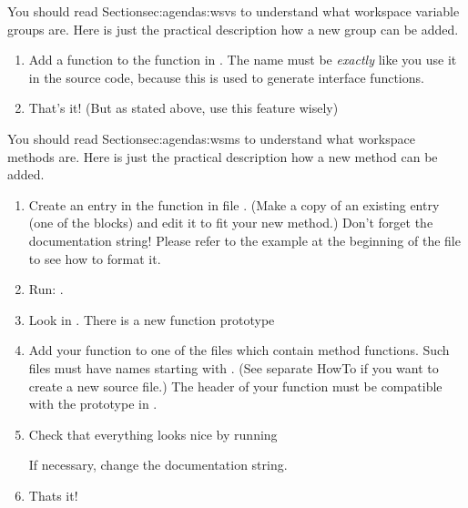 
You should read Section{sec:agendas:wsvs} to understand what workspace
variable groups are. Here is just the practical description how a new
group can be added.

\begin{enumerate}
\item Add a  function to
  the function  in . The
  name must be \emph{exactly} like you use it in the source code,
  because this is used to generate interface functions.
\item That's it! (But as stated above, use this feature wisely)
\end{enumerate}




You should read Section{sec:agendas:wsms} to understand what workspace
methods are. Here is just the practical description how a new
method can be added.

\begin{enumerate}
\item Create an entry in the function  in file
  .  (Make a copy of an existing entry (one of the
   blocks) and edit it to fit your new
  method.) Don't forget the documentation string! Please refer to the
  example at the beginning of the file to see how to format it.
\item Run:
  .
\item Look in . There is a new function prototype
  \begin{quote}
  \end{quote}
\item Add your function to one of the  files which contain method
  functions. Such files must have names starting with . (See
  separate HowTo if you want to create a new source file.) The header
  of your function must be compatible with the prototype in .
\item Check that everything looks nice by running 
  \begin{quote}
  \end{quote}
  If necessary, change the documentation string.

\item Thats it!
\end{enumerate}


